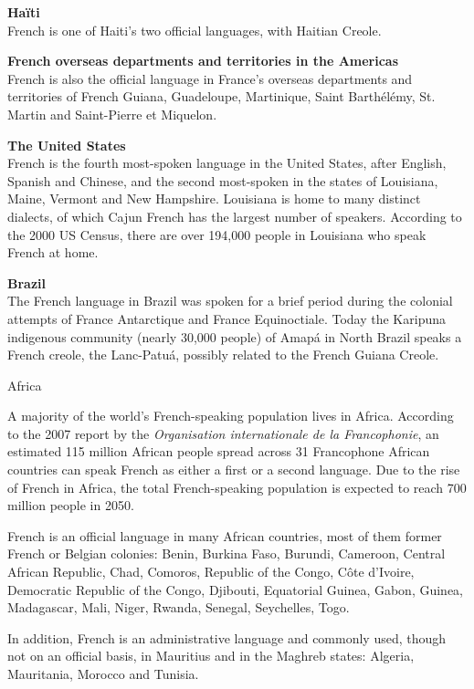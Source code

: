 \begin{multicols}{2}
{\bf Haïti}\\
French is one of Haiti's two official languages, with Haitian Creole. 

{\bf French overseas departments and territories in the Americas}\\
French is also the official language in France's overseas departments and territories of French Guiana, Guadeloupe, Martinique, Saint Barthélémy, St. Martin and Saint-Pierre et Miquelon.

{\bf The United States }\\
French is the fourth most-spoken language in the United States, after
English, Spanish and Chinese, and the second most-spoken in the states
of Louisiana, Maine, Vermont and New Hampshire. Louisiana is home to
many distinct dialects, of which Cajun French has the largest number
of speakers. According to the 2000 US Census, there are over 194,000
people in Louisiana who speak French at home.

{\bf Brazil}\\
The French language in Brazil was spoken for a brief period during the
colonial attempts of France Antarctique and France Equinoctiale. Today
the Karipuna indigenous community (nearly 30,000 people) of Amapá in
North Brazil speaks a French creole, the Lanc-Patuá, possibly related
to the French Guiana Creole.

\begin{center}
{\sc Africa}
\end{center}

A majority of the world's French-speaking population lives in
Africa. According to the 2007 report by the {\em Organisation
internationale de la Francophonie}, an estimated 115 million African
people spread across 31 Francophone African countries can speak French
as either a first or a second language. Due to the rise of French in
Africa, the total French-speaking population is expected to reach 700
million people in 2050.

French is an official language in many African countries, most of them
former French or Belgian colonies: Benin, Burkina Faso, Burundi,
Cameroon, Central African Republic, Chad, Comoros, Republic of the
Congo, Côte d'Ivoire, Democratic Republic of the Congo, Djibouti,
Equatorial Guinea, Gabon, Guinea, Madagascar, Mali, Niger, Rwanda,
Senegal, Seychelles, Togo.

In addition, French is an administrative language and commonly used,
though not on an official basis, in Mauritius and in the Maghreb
states: Algeria, Mauritania, Morocco and Tunisia.


\end{multicols}
